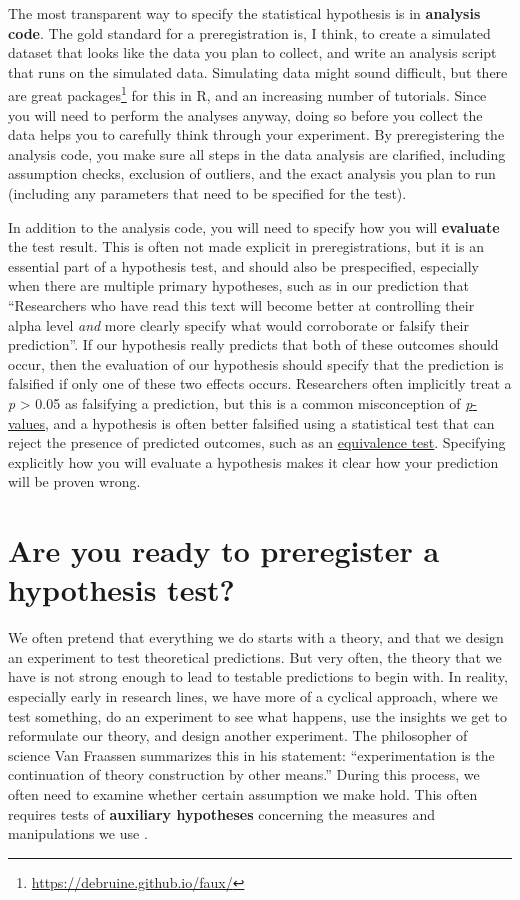 \documentclass[
  oneside]{krantz}
\renewcommand{\href}[2]{#2\footnote{\url{#1}}}
\begin{document}
The most transparent way to specify the statistical hypothesis is in \textbf{analysis code}. The gold standard for a preregistration is, I think, to create a simulated dataset that looks like the data you plan to collect, and write an analysis script that runs on the simulated data. Simulating data might sound difficult, but there are \href{https://debruine.github.io/faux/}{great packages} for this in R, and an increasing number of tutorials. Since you will need to perform the analyses anyway, doing so before you collect the data helps you to carefully think through your experiment. By preregistering the analysis code, you make sure all steps in the data analysis are clarified, including assumption checks, exclusion of outliers, and the exact analysis you plan to run (including any parameters that need to be specified for the test).

In addition to the analysis code, you will need to specify how you will \textbf{evaluate} the test result. This is often not made explicit in preregistrations, but it is an essential part of a hypothesis test, and should also be prespecified, especially when there are multiple primary hypotheses, such as in our prediction that ``Researchers who have read this text will become better at controlling their alpha level \emph{and} more clearly specify what would corroborate or falsify their prediction''. If our hypothesis really predicts that both of these outcomes should occur, then the evaluation of our hypothesis should specify that the prediction is falsified if only one of these two effects occurs. Researchers often implicitly treat a \emph{p} \textgreater{} 0.05 as falsifying a prediction, but this is a common misconception of \protect\hyperlink{misconception1}{\emph{p}-values}, and a hypothesis is often better falsified using a statistical test that can reject the presence of predicted outcomes, such as an \protect\hyperlink{equivalencetest}{equivalence test}. Specifying explicitly how you will evaluate a hypothesis makes it clear how your prediction will be proven wrong.

\hypertarget{are-you-ready-to-preregister-a-hypothesis-test}{%
\section{Are you ready to preregister a hypothesis test?}\label{are-you-ready-to-preregister-a-hypothesis-test}}

We often pretend that everything we do starts with a theory, and that we design an experiment to test theoretical predictions. But very often, the theory that we have is not strong enough to lead to testable predictions to begin with. In reality, especially early in research lines, we have more of a cyclical approach, where we test something, do an experiment to see what happens, use the insights we get to reformulate our theory, and design another experiment. The philosopher of science Van Fraassen summarizes this in his statement: ``experimentation is the continuation of theory construction by other means.'' During this process, we often need to examine whether certain assumption we make hold. This often requires tests of \textbf{auxiliary hypotheses} concerning the measures and manipulations we use \citep{uygun_tunc_falsificationist_2022}.
\end{document}
